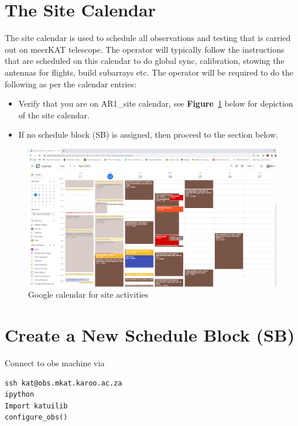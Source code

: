 

\section{The Site Calendar}
The site calendar is used to schedule all observations and testing that is carried out on meerKAT telescope. The operator will typically follow the instructions that are scheduled on this calendar to do global sync, calibration, stowing the antennas for flights, build subarrays etc. The operator will be required to do the following as per the calendar entries:

\begin{itemize}	
\item{}	Verify that you are on AR1\_site calendar, see \textbf{Figure}~\ref{fig:calendar} below for depiction of the site calendar.

\item{} If no schedule block (SB) is assigned, then proceed to the section below.
	
	
\end{itemize}




\begin{figure}[!thb]
	\centering
	\includegraphics[scale=0.25]{Chapters/images/calendar.png}
	
	\caption{Google calendar for site activities}
	\label{fig:calendar}
\end{figure}
\section{ Create a New Schedule Block (SB)}
Connect to obs machine via 
\begin{lstlisting}[style=DOS]
ssh kat@obs.mkat.karoo.ac.za
ipython
Import katuilib
configure_obs()
\end{lstlisting}


